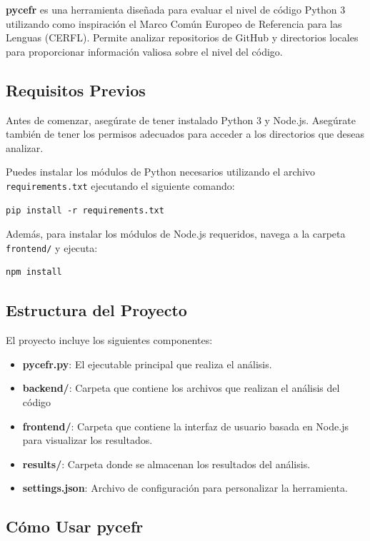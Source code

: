 \documentclass[a4paper, 12pt]{book}
\begin{document}
\textbf{pycefr} es una herramienta diseñada para evaluar el nivel de código Python 3 utilizando como inspiración el Marco Común Europeo de Referencia para las Lenguas (CERFL). Permite analizar repositorios de GitHub y directorios locales para proporcionar información valiosa sobre el nivel del código.

\subsection{Requisitos Previos}
Antes de comenzar, asegúrate de tener instalado Python 3 y Node.js. Asegúrate también de tener los permisos adecuados para acceder a los directorios que deseas analizar.

Puedes instalar los módulos de Python necesarios utilizando el archivo \texttt{requirements.txt} ejecutando el siguiente comando:

\begin{verbatim}
pip install -r requirements.txt
\end{verbatim}

Además, para instalar los módulos de Node.js requeridos, navega a la carpeta \texttt{frontend/} y ejecuta:

\begin{verbatim}
npm install
\end{verbatim}

\subsection{Estructura del Proyecto}
El proyecto incluye los siguientes componentes:

\begin{itemize}
    \item \textbf{pycefr.py}: El ejecutable principal que realiza el análisis.
    \item \textbf{backend/}: Carpeta que contiene los archivos que realizan el análisis del código
    \item \textbf{frontend/}: Carpeta que contiene la interfaz de usuario basada en Node.js para visualizar los resultados.
    \item \textbf{results/}: Carpeta donde se almacenan los resultados del análisis.
    \item \textbf{settings.json}: Archivo de configuración para personalizar la herramienta.
\end{itemize}

\subsection{Cómo Usar pycefr}
\end{document}
